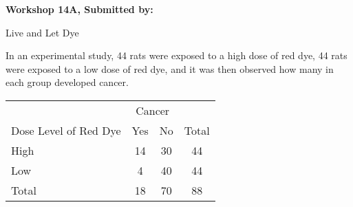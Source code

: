 \documentclass[11pt]{book}\usepackage[]{graphicx}\usepackage[]{color}
\begin{document}
\begin{exercises}
\begin{exercise}
\end{exercise}
\begin{solution}  %


\end{solution}


\clearpage

    \begin{exercise}  %

    \begin{center}
\begin{flushleft}\textbf{\large \hfill Workshop 14A, Submitted by: }\end{flushleft}

\end{center}

Live and Let Dye

In an experimental study, 44 rats were exposed to a high dose of red dye, 44 rats were exposed to a low dose of red dye, and it was then observed how many in each group developed cancer.

\begin{center}
\begin{tabular}{@{} lccc @{}} \hline
   & \multicolumn{2}{c}{Cancer} \\
Dose Level of Red Dye &	Yes	 & No &	Total \\ \hline
High &	14	& 30 &	44 \\
Low &	4 &	40 &	44  \\ \hline
Total &	18 &	70 & 88 \\ \hline
\end{tabular}
\end{center}


\end{exercise}
\end{exercises}
\end{document}
